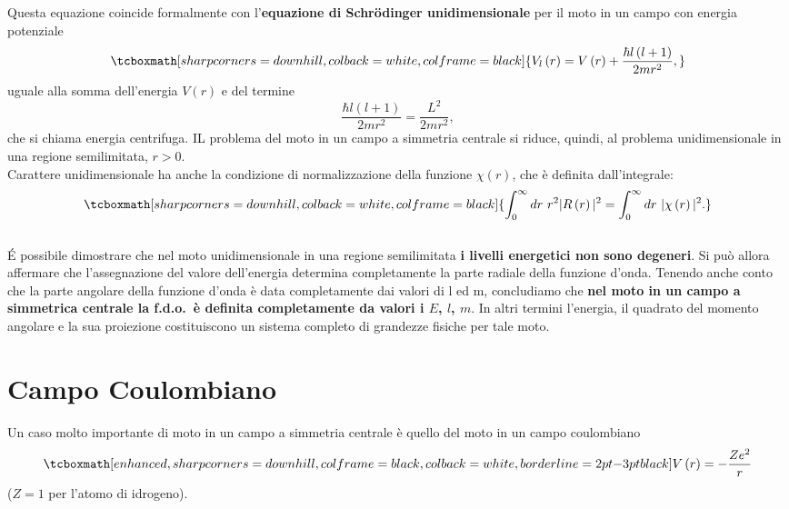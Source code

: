 Questa equazione coincide formalmente con l'\textbf{equazione di Schr\"{o}dinger unidimensionale} per il moto in un campo con energia potenziale
	\begin{equation}
		\tcboxmath[sharp corners=downhill, colback=white, colframe=black]{
			V_l\left(r\right)=V\left(r\right)+\frac{\hbar l\left(l+1\right)}{2mr^2} ,
			}
	\end{equation}
uguale alla somma dell'energia $V\left(r\right)$ e del termine
\begin{equation}
\frac{\hbar l\left(l+1\right)}{2mr^2}=\frac{L^2}{2mr^2} ,
\end{equation}
che si chiama energia centrifuga. IL problema del moto in un campo a simmetria centrale si riduce, quindi, al problema unidimensionale in una regione semilimitata, $r>0$.\\

Carattere unidimensionale ha anche la condizione di normalizzazione della funzione $\chi\left(r\right)$, che è definita dall'integrale:
	\begin{equation}
		\tcboxmath[sharp corners=downhill, colback=white, colframe=black]{
			\int_0^\infty dr\ r^2|R\left(r\right)|^2=\int_0^\infty dr\ |\chi\left(r\right)|^2 .
			}
	\end{equation}\\

É possibile dimostrare che nel moto unidimensionale in una regione semilimitata \textbf{i livelli energetici non sono degeneri}. Si può allora affermare che l'assegnazione del valore dell'energia determina completamente la parte radiale della funzione d'onda. Tenendo anche conto che la parte angolare della funzione d'onda è data completamente dai valori di l ed m, concludiamo che \textbf{nel moto in un campo a simmetrica centrale la f.d.o.~è definita completamente da valori i $E$, $l$, $m$}. In altri termini l'energia, il quadrato del momento angolare e la sua proiezione costituiscono un sistema completo di grandezze fisiche per tale moto.

\section{Campo Coulombiano}
Un caso molto importante di  moto in un campo a simmetria centrale è quello del moto in un campo coulombiano
	\begin{equation}
		\tcboxmath[enhanced, sharp corners=downhill, colframe=black, colback=white, borderline={2pt}{-3pt}{black}]{
			V\left(r\right)=-\frac{Ze^2}{r} 
			}
	\end{equation}
($Z=1$ per l'atomo di idrogeno).\\

